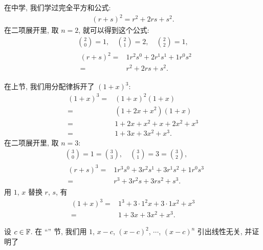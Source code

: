 \begin{example}
    在中学, 我们学过完全平方和公式:
    \begin{align*}
        (r + s)^2 = r^2 + 2rs + s^2.
    \end{align*}
    在二项展开里, 取 $n = 2$, 就可以得到这个公式:
    \begin{align*}
         & \binom{2}{0} = 1, \quad \binom{2}{1} = 2, \quad \binom{2}{2} = 1, \\
         & \begin{aligned}
            (r + s)^2
            = {} & 1r^2 s^0 + 2r^1 s^1 + 1r^0 s^2 \\
            = {} & r^2 + 2rs + s^2.
        \end{aligned}
    \end{align*}

    在上节, 我们用分配律拆开了 $(1+x)^3$:
    \begin{align*}
        (1+x)^3
        = {} & (1+x)^2 (1+x)         \\
        = {} & (1+2x+x^2) (1+x)      \\
        = {} & 1+2x+x^2 + x+2x^2+x^3 \\
        = {} & 1+3x+3x^2+x^3.
    \end{align*}
    在二项展开里, 取 $n = 3$:
    \begin{align*}
         & \binom{3}{0} = 1 = \binom{3}{3}, \quad \binom{3}{1} = 3 = \binom{3}{2}, \\
         & \begin{aligned}
            (r+s)^3
            = {} & 1r^3 s^0 + 3r^2 s^1 + 3r^1 s^2 + 1r^0 s^3 \\
            = {} & r^3 + 3r^2 s + 3r s^2 + s^3.
        \end{aligned}
    \end{align*}
    用 $1$, $x$ 替换 $r$, $s$, 有
    \begin{align*}
        (1+x)^3
        = {} & 1^3 + 3 \cdot 1^2 x + 3 \cdot 1 x^2 + x^3 \\
        = {} & 1 + 3x + 3x^2 + x^3.
    \end{align*}
\end{example}

设 $c \in \mathbb{F}$. 在 ``\PolynomialEquality'' 节, 我们用 $1$, $x-c$, $(x-c)^2$, $\cdots$, $(x-c)^n$ 引出线性无关, 并证明了

